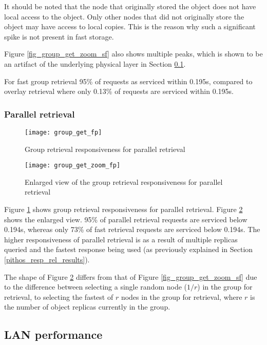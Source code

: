 It should be noted that the node that originally stored the object does not have local access to the object. Only other nodes that did not originally store the object may have access to local copies. This is the reason why such a significant spike is not present in fast storage.

Figure \ref{fig_group_get_zoom_sf} also shows multiple peaks, which is shown to be an artifact of the underlying physical layer in Section \ref{lan_retrieval}.

For fast group retrieval 95\% of requests as serviced within 0.195s, compared to overlay retrieval where only 0.13\% of requests are serviced within 0.195s.

\subsubsection{Parallel retrieval}
\begin{figure}[htbp]
 \centering
 \texttt{[image: group\_get\_fp]}
 \caption{Group retrieval responsiveness for parallel retrieval}
 \label{fig_group_get_fp}
\end{figure}

\begin{figure}[htbp]
 \centering
 \texttt{[image: group\_get\_zoom\_fp]}
 \caption{Enlarged view of the group retrieval responsiveness for parallel retrieval}
 \label{fig_group_get_zoom_fp}
\end{figure}
%
Figure \ref{fig_group_get_fp} shows group retrieval responsiveness for parallel retrieval. Figure \ref{fig_group_get_zoom_fp} shows the enlarged view. 95\% of parallel retrieval requests are serviced below 0.194s, whereas only 73\% of fast retrieval requests are serviced below 0.194s. The higher responsiveness of parallel retrieval is as a result of multiple replicas queried and the fastest response being used (as previously explained in Section \ref{pithos_resp_rel_results}).

The shape of Figure \ref{fig_group_get_zoom_fp} differs from that of Figure \ref{fig_group_get_zoom_sf} due to the difference between selecting a single random node ($1/r$) in the group for retrieval, to selecting the fastest of $r$ nodes in the group for retrieval, where $r$ is the number of object replicas currently in the group.

\subsection{LAN performance}
\label{lan_retrieval}

